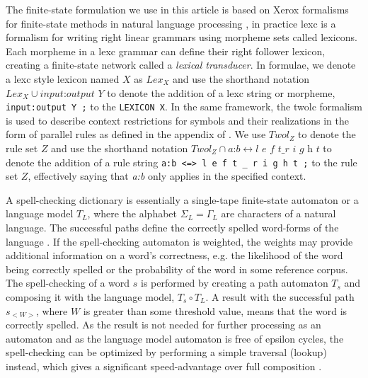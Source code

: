 \documentclass[a4paper,conference]{IEEEtran}
\begin{document}
The finite-state formulation we use in this article is based on Xerox
formalisms for finite-state methods in natural language processing
\cite{beesley/2003}, in practice lexc is a formalism for writing right linear
grammars using morpheme sets called lexicons. Each morpheme in a lexc grammar
can define their right follower lexicon, creating a finite-state network called
a \emph{lexical transducer}. In formulae, we denote a lexc style lexicon named $X$ as
$Lex_X$ and use the shorthand notation $Lex_X \cup \textit{input:output Y}$ to
denote the addition of a lexc string or morpheme, \texttt{input:output Y ;} to
the \texttt{LEXICON X}.  In the same framework, the twolc formalism is used to
describe context restrictions for symbols and their realizations in the form of
parallel rules as defined in the appendix of \cite{beesley/2003}. We use
$Twol_Z$ to denote the rule set $Z$ and use the shorthand notation $Twol_Z \cap
\textit{a:b} \leftrightarrow \textit{l e f t} \_ \textit{r i g h t}$ to denote
the addition of a rule string \texttt{a:b <=> l e f t \_ r i g h t ;} to the
rule set $Z$, effectively saying that \textit{a:b} only applies in
the specified context.

A spell-checking dictionary is essentially a single-tape finite-state
automaton or a language model $T_L$, where the alphabet $\Sigma_L =
\Gamma_L$ are characters of a natural language. The successful paths
define the correctly spelled word-forms of the language
\cite{conf/lrec/Pirinen2010}. If the spell-checking automaton is
weighted, the weights may provide additional information on a word's
correctness, e.g. the likelihood of the word being correctly spelled
or the probability of the word in some reference corpus. The
spell-checking of a word $s$ is performed by creating a path automaton
$T_s$ and composing it with the language model, $T_s \circ T_L$. A
result with the successful path $s_{<W>}$, where $W$ is greater than
some threshold value, means that the word is correctly spelled. As the
result is not needed for further processing as an automaton and as the language model
automaton is free of epsilon cycles, the spell-checking can be
optimized by performing a simple traversal (lookup) instead, which
gives a significant speed-advantage over full composition
\cite{conf/fsmnlp/Silfverberg2009}.
\end{document}
